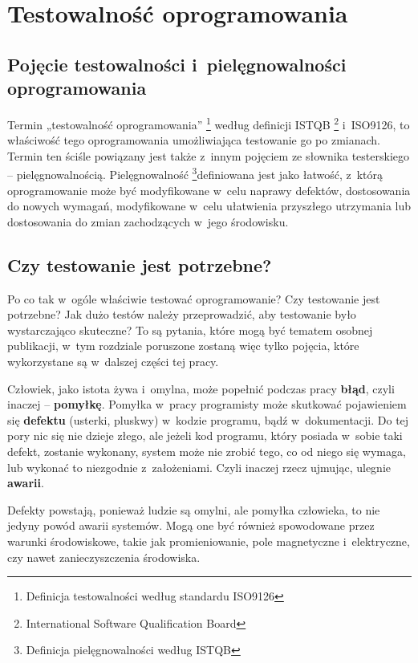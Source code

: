 \chapter{Testowalność oprogramowania}
\label{testowalnosc}
\section{Pojęcie testowalności i~pielęgnowalności \newline oprogramowania}
Termin „testowalność oprogramowania” \footnote{Definicja testowalności według standardu ISO9126}  według definicji ISTQB \footnote{International Software Qualification Board}  i~ISO9126, to właściwość tego oprogramowania umożliwiająca testowanie go po zmianach. Termin ten ściśle powiązany jest także z~innym pojęciem ze słownika testerskiego – pielęgnowalnością. Pielęgnowalność \footnote{Definicja pielęgnowalności według ISTQB}definiowana jest jako łatwość, z~którą oprogramowanie może być modyfikowane w~celu naprawy defektów, dostosowania do nowych wymagań, modyfikowane w~celu ułatwienia przyszłego utrzymania lub dostosowania do zmian zachodzących w~jego środowisku.

\section{Czy testowanie jest potrzebne?}
\label{czy_testowanie_potrzebne}
Po co tak w~ogóle właściwie testować oprogramowanie? Czy testowanie jest potrzebne? Jak dużo testów należy przeprowadzić, aby testowanie było wystarczająco skuteczne? To są pytania, które mogą być tematem osobnej publikacji, w~tym rozdziale poruszone zostaną więc tylko pojęcia, które wykorzystane są w~dalszej części tej pracy.

Człowiek, jako istota żywa i~omylna, może popełnić podczas pracy \textbf{błąd}, czyli inaczej – \textbf{pomyłkę}. Pomyłka w~pracy programisty może skutkować pojawieniem się \textbf{defektu} (usterki, pluskwy) w~kodzie programu, bądź w~dokumentacji. Do tej pory nic się nie dzieje złego, ale jeżeli kod programu, który posiada w~sobie taki defekt, zostanie wykonany, system może nie zrobić tego, co od niego się wymaga, lub wykonać to niezgodnie z~założeniami. Czyli inaczej rzecz ujmując, ulegnie \textbf{awarii}. 

Defekty powstają, ponieważ ludzie są omylni, ale pomyłka człowieka, to nie jedyny powód awarii systemów. Mogą one być również spowodowane przez warunki środowiskowe, takie jak promieniowanie, pole magnetyczne i~elektryczne, czy nawet zanieczyszczenia środowiska.


